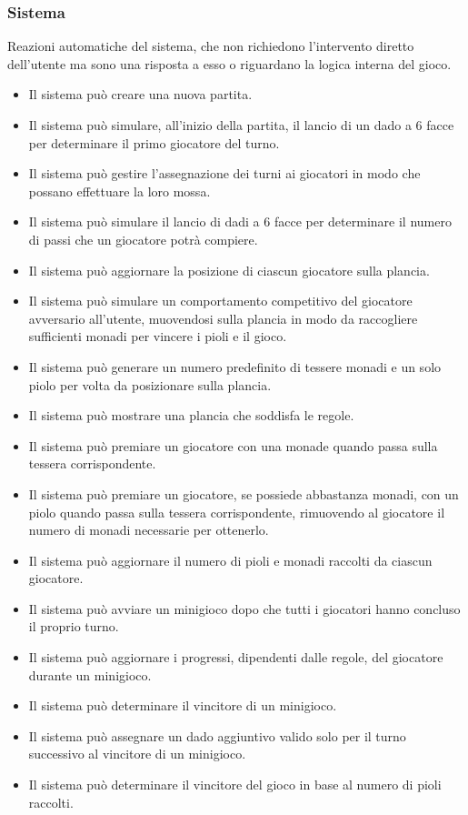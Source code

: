 \subsubsection{Sistema} \label{sec:functional-requirements:system}
Reazioni automatiche del sistema, che non richiedono l'intervento
diretto dell'utente ma sono una risposta a esso o riguardano la logica interna del gioco.
\begin{itemize}
      \item Il sistema può creare una nuova partita.
      \item Il sistema può simulare, all'inizio della partita, il lancio di un dado a 6 
            facce per determinare il primo giocatore del turno.
      \item Il sistema può gestire l'assegnazione dei turni ai giocatori in modo che possano
            effettuare la loro mossa.
      \item Il sistema può simulare il lancio di dadi a 6 facce per determinare il numero di
            passi che un giocatore potrà compiere.
      \item Il sistema può aggiornare la posizione di ciascun giocatore sulla plancia.
      \item Il sistema può simulare un comportamento competitivo del giocatore avversario 
            all'utente, muovendosi sulla plancia in modo da raccogliere sufficienti monadi
            per vincere i pioli e il gioco.
      \item Il sistema può generare un numero predefinito di tessere monadi e un solo piolo 
      per volta da posizionare sulla plancia.
      \item Il sistema può mostrare una plancia che soddisfa le regole. 
      \item Il sistema può premiare un giocatore con una monade quando passa sulla tessera 
            corrispondente.
      \item Il sistema può premiare un giocatore, se possiede abbastanza monadi, con un
            piolo quando passa sulla tessera corrispondente, rimuovendo al giocatore il
            numero di monadi necessarie per ottenerlo.
      \item Il sistema può aggiornare il numero di pioli e monadi raccolti da ciascun giocatore.
      \item Il sistema può avviare un minigioco dopo che tutti i giocatori hanno concluso
            il proprio turno.
      \item Il sistema può aggiornare i progressi, dipendenti dalle regole, del giocatore 
            durante un minigioco.
      \item Il sistema può determinare il vincitore di un minigioco.
      \item Il sistema può assegnare un dado aggiuntivo valido solo per il turno successivo al
            vincitore di un minigioco.
      \item Il sistema può determinare il vincitore del gioco in base al numero di pioli raccolti.
\end{itemize}

